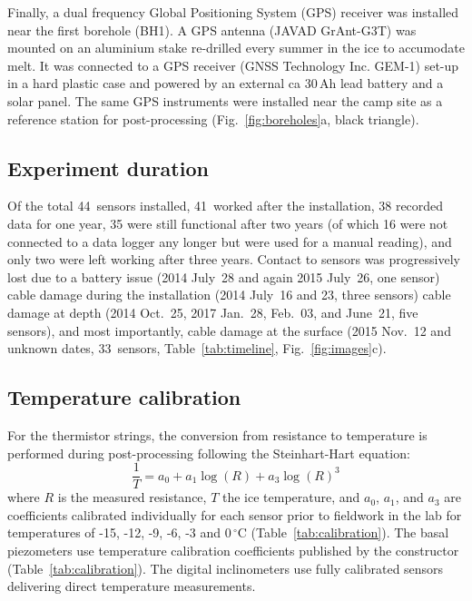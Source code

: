 \documentclass[utf8]{article}
\begin{document}
    Finally, a dual frequency Global Positioning System (GPS) receiver was
    installed near the first borehole (BH1). A GPS antenna (JAVAD GrAnt-G3T)
    was mounted on an aluminium stake re-drilled every summer in the
    ice to accumodate melt. It was connected to a GPS receiver (GNSS Technology
    Inc. GEM-1) set-up in a hard plastic case and powered by an external ca
    30\,Ah lead battery and a solar panel. The same GPS instruments were
    installed near the camp site as a reference station for post-processing
    (Fig.~\ref{fig:boreholes}a, black triangle).


\subsection{Experiment duration}

    Of the total 44~sensors installed, 41~worked after the installation, 38
    recorded data for one year, 35 were still functional after two years (of
    which 16 were not connected to a data logger any longer but were used for a
    manual reading), and only two were left
    working after three years. Contact to sensors was progressively lost due to a
    battery issue (2014 July~28 and again 2015 July~26, one sensor) cable
    damage during the installation (2014 July~16 and 23, three sensors) cable
    damage at depth (2014 Oct.~25, 2017 Jan.~28, Feb.~03, and June~21, five
    sensors), and most importantly, cable damage at the surface (2015 Nov.~12
    and unknown dates, 33~sensors, Table~\ref{tab:timeline},
    Fig.~\ref{fig:images}c).


\subsection{Temperature calibration}


    For the thermistor strings, the conversion from resistance to temperature
    is performed during post-processing following the Steinhart-Hart equation:
    \begin{equation}
      \frac{1}{T} = a_0 + a_1 \log(R) + a_3 \log(R)^3
    \end{equation}
    where $R$ is the measured resistance, $T$ the ice temperature, and $a_0$,
    $a_1$, and $a_3$ are coefficients calibrated individually for each sensor
    prior to fieldwork in the lab for temperatures of -15, -12, -9, -6, -3 and
    0\,$^\circ$C (Table~\ref{tab:calibration}). The basal piezometers use
    temperature calibration coefficients published by the constructor
    (Table~\ref{tab:calibration}). The digital inclinometers use fully
    calibrated sensors delivering direct temperature measurements.
\end{document}
